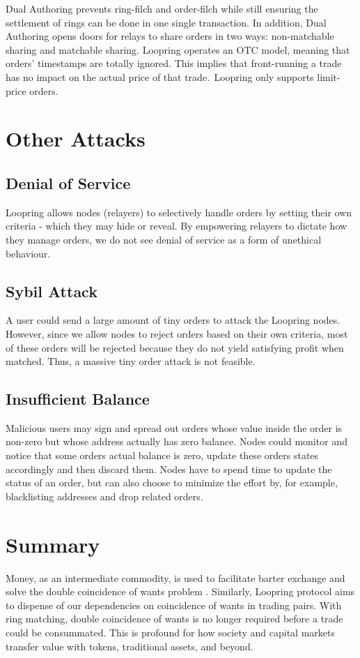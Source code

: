\documentclass[UTF8,nofonts]{article}
\begin{document}
Dual Authoring prevents ring-filch and order-filch while still ensuring the settlement of rings can be done in one single transaction. In addition, Dual Authoring opens doors for relays to share orders in two ways: non-matchable sharing and matchable sharing. Loopring operates an OTC model, meaning that orders’ timestamps are totally ignored. This implies that front-running a trade has no impact on the actual price of that trade .  Loopring only supports limit-price orders.

\section{Other Attacks}

\subsection{Denial of Service}
Loopring allows nodes (relayers) to selectively handle orders by setting their own criteria - which they may hide or reveal. By empowering relayers to dictate how they manage orders, we do not see denial of service as a form of unethical behaviour.

\subsection{Sybil Attack}
A user could send a large amount of tiny orders to attack the Loopring nodes. However, since we allow nodes to reject orders based on their own criteria, most of these orders will be rejected because they do not yield satisfying profit when matched. Thus, a massive tiny order attack is not feasible.

\subsection{Insufficient Balance}
Malicious users may sign and spread out orders whose value inside the order is non-zero but whose address actually has zero balance. Nodes could monitor and notice that some orders actual balance is zero, update these orders states accordingly and then discard them.
Nodes have to spend time to update the status of an order, but can also choose to minimize the effort by, for example, blacklisting addresses and drop related orders.


\section{Summary}
Money, as an intermediate commodity, is used to facilitate barter exchange and solve the double coincidence of wants problem \cite{unenumerated2006}. Similarly, Loopring protocol aims to dispense of our dependencies on coincidence of wants in trading pairs. With ring matching, double coincidence of wants is no longer required before a trade could be consummated. This is profound for how society and capital markets transfer value with tokens, traditional assets, and beyond.
\end{document}
